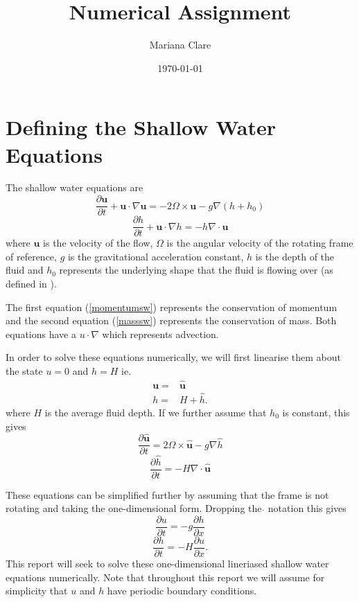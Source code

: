 \documentclass[a4paper,12pt, notitlepage]{article}
\title{Numerical Assignment}
\author{Mariana Clare}
\date{\today}
\begin{document}
	
\maketitle
\thispagestyle{empty}
\section{Defining the Shallow Water Equations}
The shallow water equations are
\begin{equation}\label{momentumsw}
\frac{\partial \mathbf{u}}{\partial t} + \mathbf{u}\cdot\nabla\mathbf{u} = - 2\Omega \times\mathbf{u} - g\nabla (h + h_{0})
\end{equation}
\begin{equation}\label{masssw}
\frac{\partial h}{\partial t} + \mathbf{u}\cdot\nabla h = - h \nabla \cdot \mathbf{u}
\end{equation}
where $\mathbf{u}$ is the velocity of the flow, $\Omega$ is the angular velocity of the rotating frame of reference, $g$ is the gravitational acceleration constant, $h$ is the depth of the fluid and $h_{0}$ represents the underlying shape that the fluid is flowing over (as defined in \cite{MPE textbook}).

The first equation (\ref{momentumsw}) represents the conservation of momentum and the second equation (\ref{masssw}) represents the conservation of mass. Both equations have a $u\cdot\nabla$ which represents advection.

In order to solve these equations numerically, we will first linearise them about the state $u = 0$ and $h = H$ ie.
\begin{eqnarray}\nonumber
\mathbf{u} =  & \mathbf{\hat{u}}
 \\   \nonumber
h = &  H + \hat{h} .
\end{eqnarray}
where $H$ is the average fluid depth. If we further assume that $h_{0}$ is constant, this gives
\begin{equation}
\frac{\partial \mathbf{\hat{u}}}{\partial t} = 2 \Omega \times \mathbf{\hat{u}} - g \nabla \hat{h}
\end{equation}
\begin{equation}
\frac{\partial \hat{h}}{\partial t} = - H \nabla \cdot \mathbf{\hat{u}}
\end{equation}

These equations can be simplified further by assuming that the frame is not rotating and taking the one-dimensional form. Dropping the $\hat{}$ notation this gives
\begin{equation}\label{linearisedsw1}
\frac{\partial u}{\partial t} = - g \frac{\partial h}{\partial x}
\end{equation}
\begin{equation}\label{linearisedsw2}
\frac{\partial h}{\partial t} = - H \frac{\partial u}{\partial x}.
\end{equation}
This report will seek to solve these one-dimensional lineriased shallow water equations numerically. Note that throughout this report we will assume for simplicity that $u$ and $h$ have periodic boundary conditions.
\end{document}
